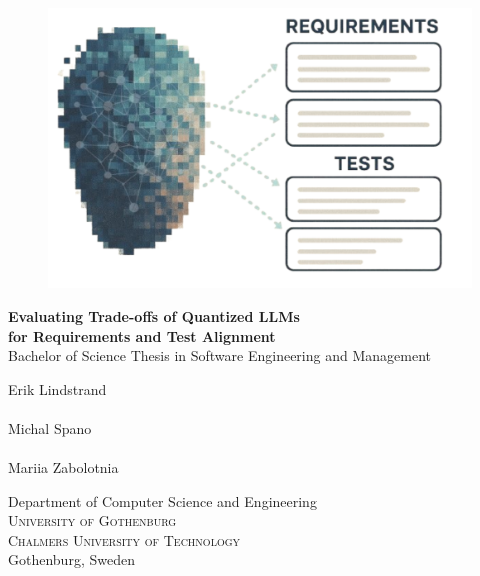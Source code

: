 \documentclass[12pt,a4paper,twoside,openright]{report}
\newcommand{\backgroundpic}[3]{
	\put(#1,#2){
	\parbox[b][\paperheight]{\paperwidth}{
	\centering
	\texttt{[image: \#3]}}}}
\begin{document}
 

\begin{titlepage}
			
\AddToShipoutPicture*{\backgroundpic{-20}{56.7}{frontpage_gu_eng_vec_m2.pdf}}
\addtolength{\voffset}{2cm}

\begin{figure}[H]
\centering
\vspace{1cm}	
\includegraphics[width=0.9\linewidth]{cover_page_transparent.png}
\end{figure}

\mbox{}
\vfill
\renewcommand{\familydefault}{\sfdefault} \normalfont %

\textbf{\Huge Evaluating Trade-offs of Quantized LLMs \\ for Requirements and Test Alignment}
\\[0.5cm]


Bachelor of Science Thesis in Software Engineering and Management \setlength{\parskip}{0.5cm}

{\Large Erik Lindstrand} \setlength{\parskip}{2.9cm} \\ \\
{\Large Michal Spano} \setlength{\parskip}{2.9cm} \\ \\
{\Large Mariia Zabolotnia} \setlength{\parskip}{2cm}

Department of Computer Science and Engineering \\
\textsc{University of Gothenburg} \\
\textsc{Chalmers University of Technology} \\
Gothenburg, Sweden \the\year

\renewcommand{\familydefault}{\rmdefault} \normalfont %
\end{titlepage}
\end{document}
